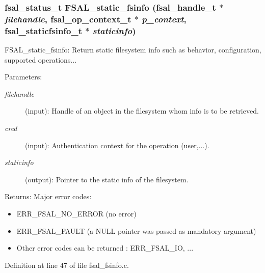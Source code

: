 \subsubsection{\setlength{\rightskip}{0pt plus 5cm}fsal\_\-status\_\-t FSAL\_\-static\_\-fsinfo (fsal\_\-handle\_\-t $\ast$ {\em filehandle}, fsal\_\-op\_\-context\_\-t $\ast$ {\em p\_\-context}, fsal\_\-staticfsinfo\_\-t $\ast$ {\em staticinfo})}\label{fsal__fsinfo_8c_a0}


FSAL\_\-static\_\-fsinfo: Return static filesystem info such as behavior, configuration, supported operations...

\begin{Desc}
\item[Parameters:]
\begin{description}
\item[{\em filehandle}](input): Handle of an object in the filesystem whom info is to be retrieved. \item[{\em cred}](input): Authentication context for the operation (user,...). \item[{\em staticinfo}](output): Pointer to the static info of the filesystem.\end{description}
\end{Desc}
\begin{Desc}
\item[Returns:]Major error codes:\begin{itemize}
\item ERR\_\-FSAL\_\-NO\_\-ERROR (no error)\item ERR\_\-FSAL\_\-FAULT (a NULL pointer was passed as mandatory argument)\item Other error codes can be returned : ERR\_\-FSAL\_\-IO, ... \end{itemize}
\end{Desc}


Definition at line 47 of file fsal\_\-fsinfo.c.